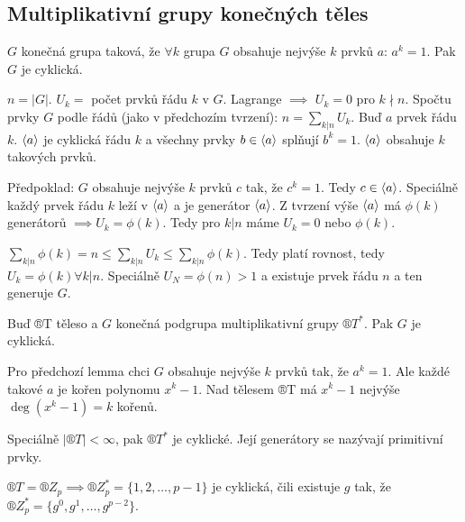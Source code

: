 \documentclass[12pt]{article}                   %
\begin{document}
    \subsection{Multiplikativní grupy konečných těles}
        \begin{lemma}
            $G$ konečná grupa taková, že $\forall k$ grupa $G$ obsahuje nejvýše $k$ prvků $a$: $a^k = 1$. Pak $G$ je cyklická.

            \begin{dukazin}
                $n = |G|$. $U_k =$ počet prvků řádu $k$ v $G$. Lagrange $\implies$ $U_k = 0$ pro $k \nmid n$. Spočtu prvky $G$ podle řádů (jako v předchozím tvrzení): $n = \sum_{k|n} U_k$. Buď $a$ prvek řádu $k$. $\left\langle a\right\rangle$ je cyklická řádu $k$ a všechny prvky $b \in \left\langle a\right\rangle$ splňují $b^k = 1$. $\left\langle a\right\rangle$ obsahuje $k$ takových prvků.

                Předpoklad: $G$ obsahuje nejvýše $k$ prvků $c$ tak, že $c^k = 1$. Tedy $c \in \left\langle a\right\rangle$. Speciálně každý prvek řádu $k$ leží v $\left\langle a\right\rangle$ a je generátor $\left\langle a\right\rangle$. Z tvrzení výše $\left\langle a\right\rangle$ má $\phi(k)$ generátorů $\implies U_k = \phi(k)$. Tedy pro $k|n$ máme $U_k = 0$ nebo $\phi(k)$.

                $\sum_{k|n} \phi(k) = n ≤ \sum_{k|n} U_k ≤ \sum_{k|n} \phi(k)$. Tedy platí rovnost, tedy $U_k = \phi(k) \forall k | n$. Speciálně $U_N = \phi(n) > 1$ a existuje prvek řádu $n$ a ten generuje $G$.
            \end{dukazin}
        \end{lemma}

        \begin{veta}
            Buď ®T těleso a $G$ konečná podgrupa multiplikativní grupy $®T^*$. Pak $G$ je cyklická.

            \begin{dukazin}
                Pro předchozí lemma chci $G$ obsahuje nejvýše $k$ prvků tak, že $a^k = 1$. Ale každé takové $a$ je kořen polynomu $x^k - 1$. Nad tělesem ®T má $x^k - 1$ nejvýše $\deg(x^k - 1) = k$ kořenů.
            \end{dukazin}
        \end{veta}

        \begin{dusledek}
            Speciálně $|®T| < ∞$, pak $®T^*$ je cyklické. Její generátory se nazývají primitivní prvky.

            $®T = ®Z_p \implies ®Z_p^* = \{1, 2, …, p-1\}$ je cyklická, čili existuje $g$ tak, že $®Z_p^* = \{g^0, g^1, …, g^{p-2}\}$.
        \end{dusledek}
\end{document}
